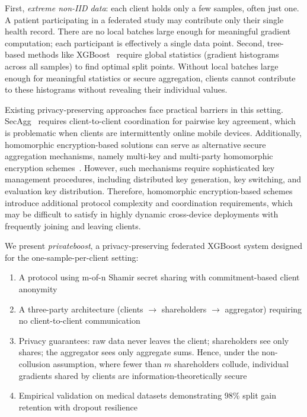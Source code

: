 \documentclass[journal,10pt]{IEEEtran}
\begin{document}
First, \textit{extreme non-IID data}: each client holds only a few samples, often just one. A patient participating in a federated study may contribute only their single health record. There are no local batches large enough for meaningful gradient computation; each participant is effectively a single data point. Second, tree-based methods like XGBoost~\cite{chen2016} require global statistics (gradient histograms across all samples) to find optimal split points. Without local batches large enough for meaningful statistics or secure aggregation, clients cannot contribute to these histograms without revealing their individual values.

Existing privacy-preserving approaches face practical barriers in this setting. SecAgg~\cite{bonawitz2017} requires client-to-client coordination for pairwise key agreement, which is problematic when clients are intermittently online mobile devices. Additionally, homomorphic encryption-based solutions can serve as alternative secure aggregation mechanisms, namely multi-key and multi-party homomorphic encryption schemes~\cite{wu2025smhe,cheon2025mphe}. However, such mechanisms require sophisticated key management procedures, including distributed key generation, key switching, and evaluation key distribution. Therefore, homomorphic encryption-based schemes introduce additional protocol complexity and coordination requirements, which may be difficult to satisfy in highly dynamic cross-device deployments with frequently joining and leaving clients.

We present \textit{privateboost}, a privacy-preserving federated XGBoost system designed for the one-sample-per-client setting:

\begin{enumerate}
  \item A protocol using m-of-n Shamir secret sharing with commitment-based client anonymity
  \item A three-party architecture (clients $\to$ shareholders $\to$ aggregator) requiring no client-to-client communication
  \item Privacy guarantees: raw data never leaves the client; shareholders see only shares; the aggregator sees only aggregate sums. Hence, under the non-collusion assumption, where fewer than $m$ shareholders collude, individual gradients shared by clients are information-theoretically secure
  \item Empirical validation on medical datasets demonstrating 98\% split gain retention with dropout resilience
\end{enumerate}
\end{document}
